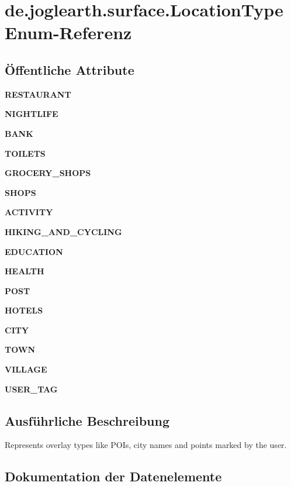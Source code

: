 \section{de.\-joglearth.\-surface.\-Location\-Type Enum-\/\-Referenz}
\label{enumde_1_1joglearth_1_1surface_1_1_location_type}
\subsection*{Öffentliche Attribute}
\begin{DoxyCompactItemize}
\item 
{\bf R\-E\-S\-T\-A\-U\-R\-A\-N\-T}
\item 
{\bf N\-I\-G\-H\-T\-L\-I\-F\-E}
\item 
{\bf B\-A\-N\-K}
\item 
{\bf T\-O\-I\-L\-E\-T\-S}
\item 
{\bf G\-R\-O\-C\-E\-R\-Y\-\_\-\-S\-H\-O\-P\-S}
\item 
{\bf S\-H\-O\-P\-S}
\item 
{\bf A\-C\-T\-I\-V\-I\-T\-Y}
\item 
{\bf H\-I\-K\-I\-N\-G\-\_\-\-A\-N\-D\-\_\-\-C\-Y\-C\-L\-I\-N\-G}
\item 
{\bf E\-D\-U\-C\-A\-T\-I\-O\-N}
\item 
{\bf H\-E\-A\-L\-T\-H}
\item 
{\bf P\-O\-S\-T}
\item 
{\bf H\-O\-T\-E\-L\-S}
\item 
{\bf C\-I\-T\-Y}
\item 
{\bf T\-O\-W\-N}
\item 
{\bf V\-I\-L\-L\-A\-G\-E}
\item 
{\bf U\-S\-E\-R\-\_\-\-T\-A\-G}
\end{DoxyCompactItemize}


\subsection{Ausführliche Beschreibung}
Represents overlay types like P\-O\-Is, city names and points marked by the user. 

\subsection{Dokumentation der Datenelemente}
